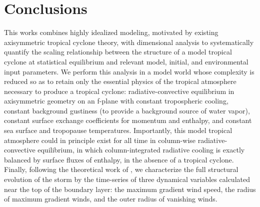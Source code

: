 \documentclass[12pt]{article}
\begin{document}
\section{Conclusions}
This works combines highly idealized modeling, motivated by existing axisymmetric tropical cyclone theory, with dimensional analysis to systematically quantify the scaling relationship between the structure of a model tropical cyclone at statistical equilibrium and relevant model, initial, and environmental input parameters. We perform this analysis in a model world whose complexity is reduced so as to retain only the essential physics of the tropical atmosphere necessary to produce a tropical cyclone: radiative-convective equilibrium in axisymmetric geometry on an f-plane with constant tropospheric cooling, constant background gustiness (to provide a background source of water vapor), constant surface exchange coefficients for momentum and enthalpy, and constant sea surface and tropopause temperatures. Importantly, this model tropical atmosphere could in principle exist for all time in column-wise radiative-convective equilibrium, in which column-integrated radiative cooling is exactly balanced by surface fluxes of enthalpy, in the absence of a tropical cyclone.  Finally, following the theoretical work of \cite{Emanuel_Rotunno_2011}, we characterize the full structural evolution of the storm by the time-series of three dynamical variables calculated near the top of the boundary layer: the maximum gradient wind speed, the radius of maximum gradient winds, and the outer radius of vanishing winds.
\end{document}
